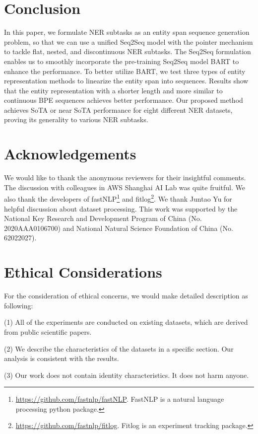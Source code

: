 \documentclass[11pt,a4paper]{article}
\begin{document}
\section{Conclusion}
In this paper, we formulate NER subtasks as an entity span sequence generation problem, so that we can use a unified Seq2Seq model with the pointer mechanism to tackle flat, nested, and discontinuous NER subtasks. The Seq2Seq formulation enables us to smoothly incorporate the pre-training Seq2Seq model BART to enhance the performance. To better utilize BART, we test three types of entity representation methods to linearize the entity span into sequences. Results show that the entity representation with a shorter length and more similar to continuous BPE sequences achieves better performance. Our proposed method achieves SoTA or near SoTA performance for eight different NER datasets, proving its generality to various NER subtasks.


\section*{Acknowledgements}
We would like to thank the anonymous reviewers for their insightful comments. The discussion with colleagues in AWS Shanghai AI Lab was quite fruitful. We also thank the developers of fastNLP\footnote{\url{https://github.com/fastnlp/fastNLP}. FastNLP is a natural language processing python package.} and fitlog\footnote{\url{https://github.com/fastnlp/fitlog}. Fitlog is an experiment tracking package.}. We thank Juntao Yu for helpful discussion about dataset processing. This work was supported by the National Key Research and Development Program of China (No. 2020AAA0106700) and National Natural Science Foundation of China (No. 62022027).



\section*{Ethical Considerations}
For the consideration of ethical concerns, we would make detailed description  as following:

(1) All of the experiments are conducted on existing datasets, which are derived from public scientific papers.

(2) We describe the characteristics of the datasets in a specific section. Our analysis is consistent with the results.

(3) Our work does not contain identity characteristics. It does not harm anyone.
\end{document}
